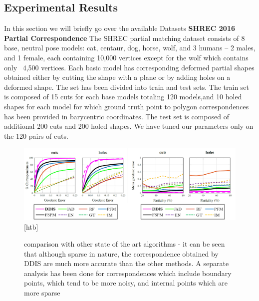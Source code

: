 \documentclass[10pt,twocolumn,letterpaper]{article}
\begin{document}
\subsection{Experimental Results}
In this section we will briefly go over the available Datasets
\textbf{SHREC 2016 Partial Correspondence}  
The SHREC partial matching dataset\cite{cosmo2016shrec} consists of 8 base, neutral pose models: cat, centaur, dog, horse, wolf, and 3 humans – 2 males, and 1 female, each containing 10,000 vertices except for the wolf which contains only ~4,500 vertices. Each basic model has corresponding deformed partial shapes obtained either by cutting the shape with a plane or by adding holes on a deformed shape. The set has been divided into train and test sets. The train set is composed of 15 cuts for each base models totaling 120 models,and 10 holed shapes for each model for which ground truth point to polygon correspondences has been provided in barycentric coordinates. The test set is composed of additional 200 cuts and 200 holed shapes. We have tuned our parameters only on the 120 pairs of cuts.

\begin{figure}[htb]
	\centering

	\includegraphics[width=1\textwidth]{figures/ROCSHREC16.png}[htb]
	\caption{comparison with other state of the art algorithms - it can be seen that although sparse in nature, the correspondence obtained by DDIS are much more accurate than the other methods. 
		A separate analysis has been done for correspondences which include boundary points, which tend to be more noisy, and internal points which are more sparse}
\end{figure}
\end{document}
